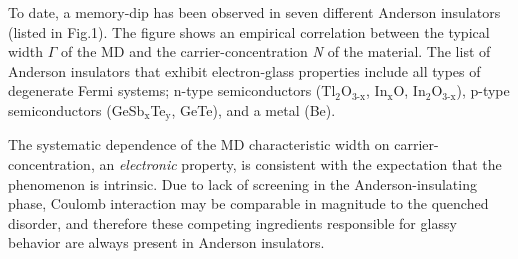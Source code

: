 \documentclass
[preprint,showpacs,byrevtex,10pt,twocolumn,tightenlines,prl,letterpaper]{revtex4}%
\begin{document}
To date, a memory-dip has been observed in seven different Anderson insulators
(listed in Fig.1). The figure shows an empirical correlation between the
typical width $\Gamma$ of the MD and the carrier-concentration \textit{N} of
the material. The list of Anderson insulators that exhibit electron-glass
properties include all types of degenerate Fermi systems; n-type
semiconductors (Tl$_{\text{2}}$O$_{\text{3-x}}$, In$_{\text{x}}$O,
In$_{\text{2}}$O$_{\text{3-x}}$), p-type semiconductors (GeSb$_{\text{x}}%
$Te$_{\text{y}}$, GeTe), and a metal (Be).

The systematic dependence of the MD characteristic width on
carrier-concentration, an \textit{electronic} property, is consistent with the
expectation that the phenomenon is intrinsic. Due to lack of screening in the
Anderson-insulating phase, Coulomb interaction may be comparable in magnitude
to the quenched disorder, and therefore these competing ingredients
responsible for glassy behavior are always present in Anderson insulators.
\end{document}
